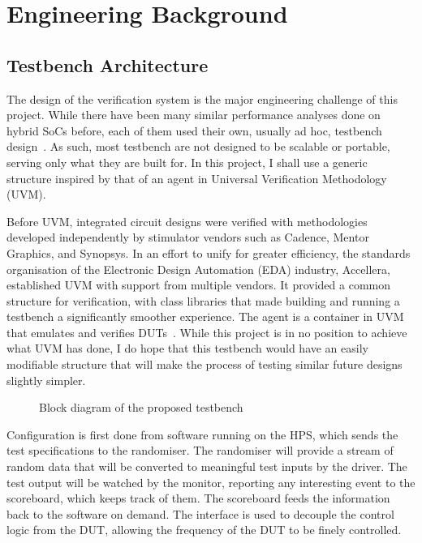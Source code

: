 \section{Engineering Background}

\subsection{Testbench Architecture}

The design of the verification system is the major engineering challenge of this
project.
While there have been many similar performance analyses done on hybrid SoCs
before, each of them used their own, usually ad hoc, testbench
design~\cite{Shi1}.
As such, most testbench are not designed to be scalable or portable, serving
only what they are built for.
In this project, I shall use a generic structure inspired by that of an agent
in Universal Verification Methodology (UVM).

Before UVM, integrated circuit designs were verified with methodologies
developed independently by stimulator vendors such as Cadence, Mentor Graphics,
and Synopsys.
In an effort to unify for greater efficiency, the standards organisation of the
Electronic Design Automation (EDA) industry, Accellera, established UVM with
support from multiple vendors.
It provided a common structure for verification, with class libraries that made
building and running a testbench a significantly smoother experience.
The agent is a container in UVM that emulates and verifies
DUTs~\cite{Accellera1}.
While this project is in no position to achieve what UVM has done, I do hope
that this testbench would have an easily modifiable structure that will make
the process of testing similar future designs slightly simpler.

\begin{figure}[H]
  \centering
  
  \caption{Block diagram of the proposed testbench}
  \label{Block}
\end{figure}

Configuration is first done from software running on the HPS, which sends
the test specifications to the randomiser.
The randomiser will provide a stream of random data that will be converted
to meaningful test inputs by the driver.
The test output will be watched by the monitor, reporting any interesting
event to the scoreboard, which keeps track of them.
The scoreboard feeds the information back to the software on demand.
The interface is used to decouple the control logic from the DUT, allowing
the frequency of the DUT to be finely controlled.

